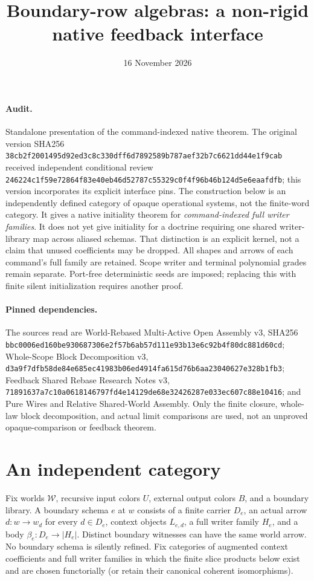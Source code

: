 \documentclass[11pt]{article}
\title{Boundary-row algebras: a non-rigid native feedback interface}
\date{16 November 2026}
\begin{document}
\maketitle
\paragraph{Audit.} Standalone presentation of the command-indexed native theorem. The original version SHA256 \texttt{38cb2f2001495d92ed3c8c330dff6d7892589b787aef32b7c6621dd44e1f9cab} received independent conditional review \texttt{246224c1f59e72864f83e40eb46d52787c55329c0f4f96b46b124d5e6eaafdfb}; this version incorporates its explicit interface pins. The construction below is an independently defined category of opaque operational systems, not the finite-word category. It gives a native initiality theorem for \emph{command-indexed full writer families}. It does not yet give initiality for a doctrine requiring one shared writer-library map across aliased schemas. That distinction is an explicit kernel, not a claim that unused coefficients may be dropped. All shapes and arrows of each command's full family are retained. Scope writer and terminal polynomial grades remain separate. Port-free deterministic seeds are imposed; replacing this with finite silent initialization requires another proof.

\paragraph{Pinned dependencies.} The sources read are World-Rebased Multi-Active Open Assembly v3, SHA256 \texttt{bbc0006ed160be930687306e2f57b6ab57d111e93b13e6c92b4f80dc881d60cd}; Whole-Scope Block Decomposition v3, \texttt{d3a9f7dfb58de84e685ec41983b06ed4914fa615d76b6aa23040627e328b1fb3}; Feedback Shared Rebase Research Notes v3, \texttt{71891637a7c10a0618146797fd4e14129de68e32426287e033ec607c88e10416}; and Pure Wires and Relative Shared-World Assembly. Only the finite closure, whole-law block decomposition, and actual limit comparisons are used, not an unproved opaque-comparison or feedback theorem.

\section{An independent category}
Fix worlds $\mathcal W$, recursive input colors $U$, external output colors $B$, and a boundary library. A boundary schema $e$ at $w$ consists of a finite carrier $D_e$, an actual arrow $d:w\to w_d$ for every $d\in D_e$, context objects $L_{e,d}$, a full writer family $H_e$, and a body $\beta_e:D_e\to |H_e|$. Distinct boundary witnesses can have the same world arrow. No boundary schema is silently refined. Fix categories of augmented context coefficients and full writer families in which the finite slice products below exist and are chosen functorially (or retain their canonical coherent isomorphisms).
\end{document}
